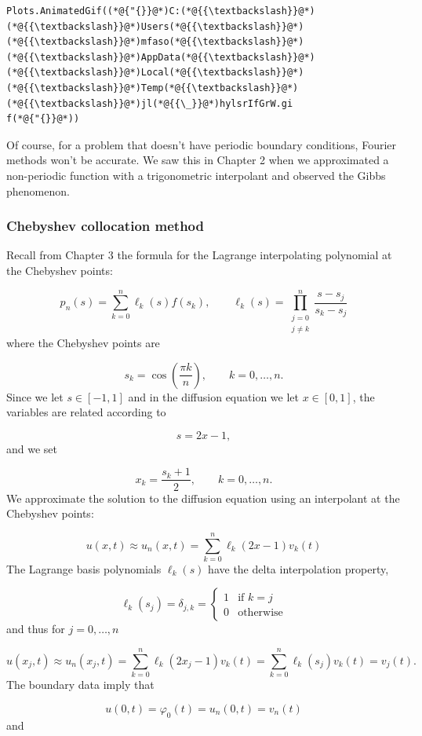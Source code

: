 \documentclass[12pt,a4paper]{article}
\begin{document}
\begin{lstlisting}
Plots.AnimatedGif((*@{"{}}@*)C:(*@{{\textbackslash}}@*)(*@{{\textbackslash}}@*)Users(*@{{\textbackslash}}@*)(*@{{\textbackslash}}@*)mfaso(*@{{\textbackslash}}@*)(*@{{\textbackslash}}@*)AppData(*@{{\textbackslash}}@*)(*@{{\textbackslash}}@*)Local(*@{{\textbackslash}}@*)(*@{{\textbackslash}}@*)Temp(*@{{\textbackslash}}@*)(*@{{\textbackslash}}@*)jl(*@{{\_}}@*)hylsrIfGrW.gi
f(*@{"{}}@*))
\end{lstlisting}


Of course, for a problem that doesn't have periodic boundary conditions, Fourier methods won't be accurate.  We saw this in Chapter 2 when we approximated a non-periodic function with a trigonometric interpolant and observed the Gibbs phenomenon. 

\subsubsection{Chebyshev collocation method}
Recall from Chapter 3 the formula for the Lagrange interpolating polynomial at the Chebyshev points:

\[
p_{n}(s) = \sum_{k = 0}^{n}\ell_k(s)f(s_k), \qquad \ell_k(s) = \prod_{\substack{j=0\\ j \neq k}}^{n}\frac{s-s_j}{s_k-s_j}
\]
where the Chebyshev points are

\[
s_k = \cos\left(\frac{\pi k}{n} \right), \qquad k = 0, \ldots, n.
\]
Since we let $s \in [-1, 1]$ and in the diffusion equation we let $x \in [0, 1]$, the variables are related according to

\[
s = 2x - 1,
\]
and we set

\[
x_k = \frac{s_k+1}{2}, \qquad k = 0, \ldots, n.
\]
We approximate the solution to the diffusion equation using an interpolant at the Chebyshev points:

\[
u(x,t) \approx u_n(x,t) = \sum_{k=0}^n \ell_k(2x - 1)v_k(t)
\]
The Lagrange basis polynomials $\ell_k(s)$ have the delta interpolation property,

\[
\ell_k(s_j) = \delta_{j,k} = \begin{cases}
1 & \text{if } k = j \\
0 & \text{otherwise}
\end{cases}
\]
and thus for $j = 0, \ldots, n$

\[
u(x_j,t) \approx u_n(x_j,t)= \sum_{k=0}^n \ell_k(2x_j - 1)v_k(t) = \sum_{k=0}^n \ell_k(s_j)v_k(t) = v_j(t).
\]
The boundary data imply that

\[
u(0,t) = \varphi_0(t) = u_n(0,t) = v_n(t)
\]
and
\end{document}
